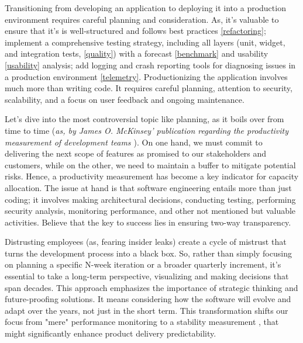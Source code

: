 

Transitioning from developing an application to deploying it into a production environment requires careful planning 
and consideration. As, it's valuable to ensure that it's is well-structured and follows best practices 
\ref{refactoring}; implement a comprehensive testing strategy, including all layers (unit, widget, and integration 
tests, \ref{quality}) with a forecast \ref{benchmark} and usability \ref{usability} analysis; add logging and crash 
reporting tools for diagnosing issues in a production environment \ref{telemetry}. Productionizing the application 
involves much more than writing code. It requires careful planning, attention to security, scalability, and a focus 
on user feedback and ongoing maintenance. 

Let's dive into the most controversial topic like planning, as it boils over from time to time (\emph{as, by James O. 
McKinsey' publication regarding the productivity measurement of development teams \cite{McKi23}}). On one hand, we 
must commit to delivering the next scope of features as promised to our stakeholders and customers, while on the other, 
we need to maintain a buffer to mitigate potential risks. Hence, a productivity measurement has become a key indicator 
for capacity allocation. The issue at hand is that software engineering entails more than just coding; it involves 
making architectural decisions, conducting testing, performing security analysis, monitoring performance, and other 
not mentioned but valuable activities. Believe that the key to success lies in ensuring two-way transparency. 

Distrusting employees (as, fearing insider leaks) create a cycle of mistrust that turns the development process into a 
black box. So, rather than simply focusing on planning a specific N-week iteration or a broader quarterly increment, 
it's essential to take a long-term perspective, visualizing and making decisions that span decades. This approach 
emphasizes the importance of strategic thinking and future-proofing solutions. It means considering how the software 
will evolve and adapt over the years, not just in the short term. This transformation shifts our focus from "mere" 
performance monitoring to a stability measurement \cite{Heal23}, that might significantly enhance product delivery 
predictability.

